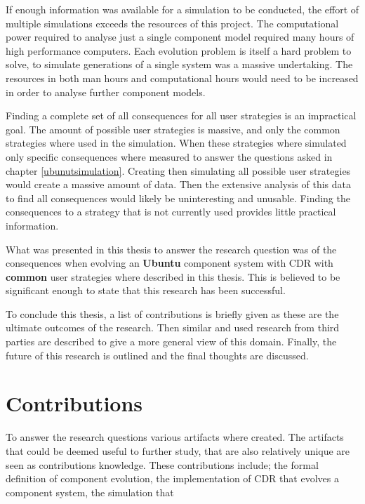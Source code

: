 If enough information was available for a simulation to be conducted, the effort of multiple simulations exceeds the resources of this project.
The computational power required to analyse just a single component model required many hours of high performance computers.
Each evolution problem is itself a hard problem to solve, to simulate generations of a single system was a massive undertaking.
The resources in both man hours and computational hours would need to be increased in order to analyse further component models.

Finding a complete set of all consequences for all user strategies is an impractical goal.
The amount of possible user strategies is massive, and only the common strategies where used in the simulation.
When these strategies where simulated only specific consequences where measured to answer the questions asked in chapter \ref{ubunutsimulation}.
Creating then simulating all possible user strategies would create a massive amount of data.
Then the extensive analysis of this data to find all consequences would likely be uninteresting and unusable.
Finding the consequences to a strategy that is not currently used provides little practical information.

What was presented in this thesis to answer the research question was 
 of the consequences when evolving an \textbf{Ubuntu} component system with CDR with \textbf{common} user strategies where described in this thesis.
This is believed to be significant enough to state that this research has been successful.  

To conclude this thesis, a list of contributions is briefly given as these are the ultimate outcomes of the research.
Then similar and used research from third parties are described to give a more general view of this domain.
Finally, the future of this research is outlined and the final thoughts are discussed.

\section{Contributions}
To answer the research questions various artifacts where created.
The artifacts that could be deemed useful to further study, that are also relatively unique are seen as contributions knowledge. 
These contributions include; the formal definition of component evolution, the implementation of CDR that evolves a component system,
the simulation that  


